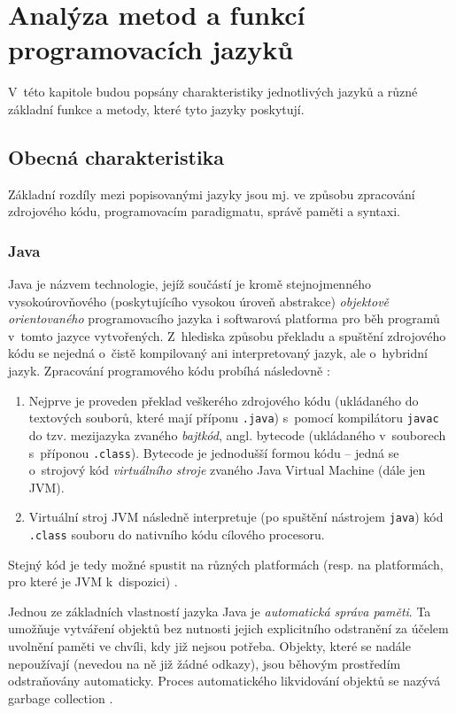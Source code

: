 \documentclass[czech,BP]{thesiskiv}
\begin{document}
\chapter{Analýza metod a funkcí programovacích jazyků}
V~této kapitole budou popsány charakteristiky jednotlivých jazyků a různé základní funkce a metody, které tyto jazyky poskytují. 

\section{Obecná charakteristika}
Základní rozdíly mezi popisovanými jazyky jsou mj. ve způsobu zpracování zdrojového kódu, programovacím paradigmatu, správě paměti a syntaxi.

\subsection{Java}
Java je názvem technologie, jejíž součástí je kromě stejnojmenného vysokoúrovňového (poskytujícího vysokou úroveň abstrakce) \textit{objektově orientovaného} programovacího jazyka i softwarová platforma pro běh programů v~tomto jazyce vytvořených. Z~hlediska způsobu překladu a spuštění zdrojového kódu se nejedná o~čistě kompilovaný ani interpretovaný jazyk, ale o~hybridní jazyk. Zpracování programového kódu probíhá následovně \cite{java-book, java-guide-vm, java-guide-javac, java-guide-java}:
\begin{enumerate}
\item Nejprve je proveden překlad veškerého zdrojového kódu (ukládaného do textových souborů, které mají příponu \texttt{.java}) s~pomocí kompilátoru \texttt{javac} do tzv. mezijazyka zvaného \textit{bajtkód}, angl. bytecode (ukládaného v~souborech s~příponou \texttt{.class}). Bytecode je jednodušší formou kódu -- jedná se o~strojový kód \textit{virtuálního stroje} zvaného Java Virtual Machine (dále jen JVM). 
\item Virtuální stroj JVM následně interpretuje (po spuštění nástrojem \texttt{java}) kód \texttt{.class} souboru do nativního kódu cílového procesoru. 
\end{enumerate}
Stejný kód je tedy možné spustit na různých platformách (resp. na platformách, pro které je JVM k~dispozici) \cite{java-book}.\par
Jednou ze základních vlastností jazyka Java je \textit{automatická správa paměti}. Ta umožňuje vytváření objektů bez nutnosti jejich explicitního odstranění za účelem uvolnění paměti ve chvíli, kdy již nejsou potřeba. Objekty, které se nadále nepoužívají (nevedou na ně již žádné odkazy), jsou běhovým prostředím odstraňovány automaticky. Proces automatického likvidování objektů se nazývá garbage collection \cite{java-book, java-guide-vm}.
\end{document}
